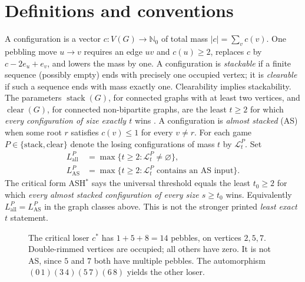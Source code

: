 \documentclass[11pt,a4paper]{article}
\newcommand{\Gcoords}{%
\coordinate (v0) at (-2.8,0);\coordinate (v3) at (-.8,0);
\coordinate (v5) at (-1.8,1.2);\coordinate (v6) at (-1.8,-1.2);
\coordinate (v1) at (2.6,0);\coordinate (v4) at (4.6,0);
\coordinate (v7) at (3.6,1.2);\coordinate (v8) at (3.6,-1.2);
\coordinate (v2) at (.9,-2.5);}
\newcommand{\Gedges}{\foreach \a/\b in {0/3,0/5,0/6,1/4,1/7,1/8,2/6,2/8,3/5,3/6,4/7,4/8,5/7,6/8}{\draw[line width=.7pt] (v\a)--(v\b);}}
\newcommand{\Gvertices}{\foreach \i in {0,1,2,3,4,5,6,7,8}{\node[draw,fill=white,circle,inner sep=0pt,minimum size=7mm,font=\small\bfseries] at (v\i) {\i};}}
\begin{document}
\section{Definitions and conventions}
A configuration is a vector \(c:V(G)\to\mathbb{N}_0\) of total mass \(|c|=\sum_v c(v)\). One pebbling move \(u\to v\) requires an edge \(uv\) and \(c(u)\ge2\), replaces \(c\) by \(c-2e_u+e_v\), and lowers the mass by one. A configuration is \emph{stackable} if a finite sequence (possibly empty) ends with precisely one occupied vertex; it is \emph{clearable} if such a sequence ends with mass exactly one. Clearability implies stackability. The parameters \(\operatorname{stack}(G)\), for connected graphs with at least two vertices, and \(\operatorname{clear}(G)\), for connected non-bipartite graphs, are the least \(t\ge2\) for which \emph{every configuration of size exactly \(t\)} wins \cite{CSApril}.
A configuration is \emph{almost stacked} (AS) when some root \(r\) satisfies \(c(v)\le1\) for every \(v\ne r\). For each game \(P\in\{\mathrm{stack},\mathrm{clear}\}\) denote the losing configurations of mass \(t\) by \(\mathcal{L}_t^P\). Set
\begin{align*}
L_{\mathrm{all}}^P&=\max\{t\ge2:\mathcal{L}_t^P\ne\varnothing\},\\
L_{\mathrm{AS}}^P&=\max\{t\ge2:\mathcal{L}_t^P\text{ contains an AS input}\}.
\end{align*}
The critical form ASH$^*$ says the universal threshold equals the least \(t_0\ge2\) for which \emph{every almost stacked configuration of every size \(s\ge t_0\)} wins. Equivalently \(L_{\mathrm{all}}^P=L_{\mathrm{AS}}^P\) in the graph classes above. This is not the stronger printed \emph{least exact \(t\)} statement.
\begin{figure}[H]\centering
{}
\caption{The critical loser \(c^*\) has \(1+5+8=14\) pebbles, on vertices \(2,5,7\). Double-rimmed vertices are occupied; all others have zero. It is not AS, since \(5\) and \(7\) both have multiple pebbles. The automorphism \((0\,1)(3\,4)(5\,7)(6\,8)\) yields the other loser.}\label{fig:loser}
\end{figure}
\end{document}

